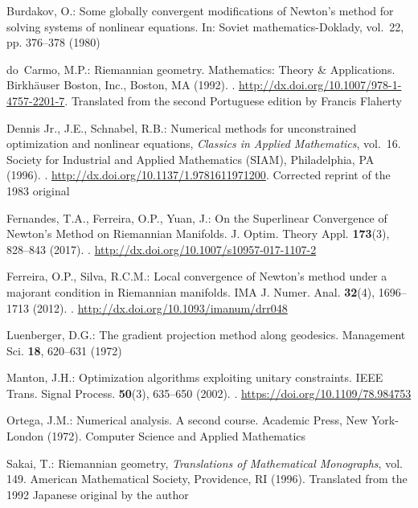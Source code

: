 \begin{thebibliography}{}
Burdakov, O.: Some globally convergent modifications of Newton's method for
  solving systems of nonlinear equations.
\newblock In: Soviet mathematics-Doklady, vol.~22, pp. 376--378 (1980)

do~Carmo, M.P.: Riemannian geometry.
\newblock Mathematics: Theory \& Applications. Birkh\"auser Boston, Inc.,
  Boston, MA (1992).
\newblock {}.
\newblock \urlprefix\url{http://dx.doi.org/10.1007/978-1-4757-2201-7}.
\newblock Translated from the second Portuguese edition by Francis Flaherty

Dennis Jr., J.E., Schnabel, R.B.: Numerical methods for unconstrained
  optimization and nonlinear equations, \emph{Classics in Applied Mathematics},
  vol.~16.
\newblock Society for Industrial and Applied Mathematics (SIAM), Philadelphia,
  PA (1996).
\newblock {}.
\newblock \urlprefix\url{http://dx.doi.org/10.1137/1.9781611971200}.
\newblock Corrected reprint of the 1983 original

Fernandes, T.A., Ferreira, O.P., Yuan, J.: On the {S}uperlinear {C}onvergence
  of {N}ewton's {M}ethod on {R}iemannian {M}anifolds.
\newblock J. Optim. Theory Appl. \textbf{173}(3), 828--843 (2017).
\newblock {}.
\newblock \urlprefix\url{http://dx.doi.org/10.1007/s10957-017-1107-2}

Ferreira, O.P., Silva, R.C.M.: Local convergence of {N}ewton's method under a
  majorant condition in {R}iemannian manifolds.
\newblock IMA J. Numer. Anal. \textbf{32}(4), 1696--1713 (2012).
\newblock {}.
\newblock \urlprefix\url{http://dx.doi.org/10.1093/imanum/drr048}

Luenberger, D.G.: The gradient projection method along geodesics.
\newblock Management Sci. \textbf{18}, 620--631 (1972)

Manton, J.H.: Optimization algorithms exploiting unitary constraints.
\newblock IEEE Trans. Signal Process. \textbf{50}(3), 635--650 (2002).
\newblock {}.
\newblock \urlprefix\url{https://doi.org/10.1109/78.984753}

Ortega, J.M.: Numerical analysis. {A} second course.
\newblock Academic Press, New York-London (1972).
\newblock Computer Science and Applied Mathematics

Sakai, T.: Riemannian geometry, \emph{Translations of Mathematical Monographs},
  vol. 149.
\newblock American Mathematical Society, Providence, RI (1996).
\newblock Translated from the 1992 Japanese original by the author


\end{thebibliography}
